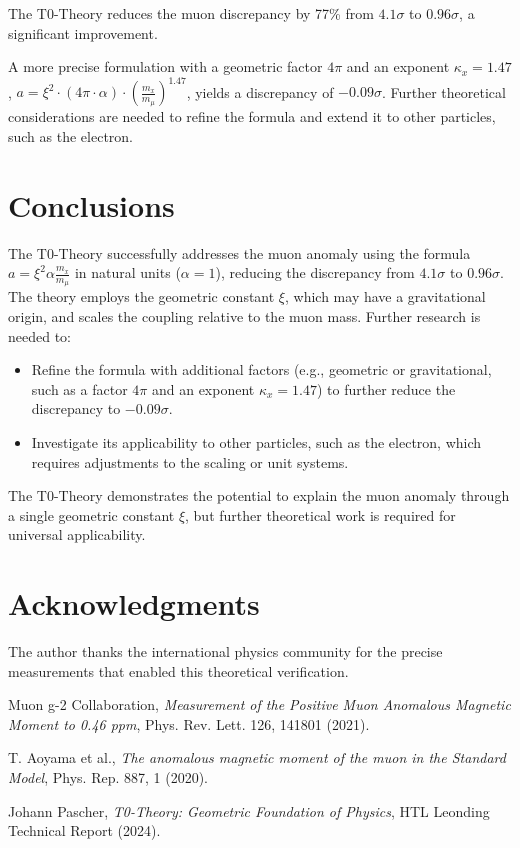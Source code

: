 \documentclass[12pt,a4paper]{article}
\newcommand{\xipar}{\xi}
\begin{document}
	\begin{success}
		The T0-Theory reduces the muon discrepancy by 77\% from \(4.1\sigma\) to \(0.96\sigma\), a significant improvement.
	\end{success}
	
	\begin{caution}
		A more precise formulation with a geometric factor \(4\pi\) and an exponent \(\kappa_x = 1.47\), \(a = \xipar^2 \cdot (4\pi \cdot \alpha) \cdot \left(\frac{m_x}{m_\mu}\right)^{1.47}\), yields a discrepancy of \(-0.09\sigma\). Further theoretical considerations are needed to refine the formula and extend it to other particles, such as the electron.
	\end{caution}
	
	\section{Conclusions}
	
	The T0-Theory successfully addresses the muon anomaly using the formula \(a = \xipar^2 \alpha \frac{m_x}{m_\mu}\) in natural units (\(\alpha = 1\)), reducing the discrepancy from \(4.1\sigma\) to \(0.96\sigma\). The theory employs the geometric constant \(\xipar\), which may have a gravitational origin, and scales the coupling relative to the muon mass. Further research is needed to:
	\begin{itemize}
		\item Refine the formula with additional factors (e.g., geometric or gravitational, such as a factor \(4\pi\) and an exponent \(\kappa_x = 1.47\)) to further reduce the discrepancy to \(-0.09\sigma\).
		\item Investigate its applicability to other particles, such as the electron, which requires adjustments to the scaling or unit systems.
	\end{itemize}
	
	The T0-Theory demonstrates the potential to explain the muon anomaly through a single geometric constant \(\xipar\), but further theoretical work is required for universal applicability.
	
	\section*{Acknowledgments}
	
	The author thanks the international physics community for the precise measurements that enabled this theoretical verification.
	
	\begin{thebibliography}{9}
		
		Muon g-2 Collaboration,
		\textit{Measurement of the Positive Muon Anomalous Magnetic Moment to 0.46 ppm},
		Phys. Rev. Lett. 126, 141801 (2021).
		
		T. Aoyama et al.,
		\textit{The anomalous magnetic moment of the muon in the Standard Model},
		Phys. Rep. 887, 1 (2020).
		
		Johann Pascher,
		\textit{T0-Theory: Geometric Foundation of Physics},
		HTL Leonding Technical Report (2024).
		
	\end{thebibliography}
	
\end{document}
